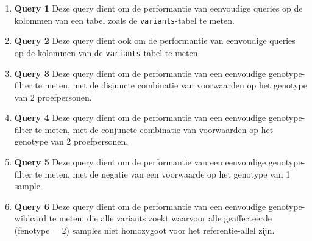 \begin{enumerate}
\item \textbf{Query 1} Deze query dient om de performantie van eenvoudige queries op de kolommen van een tabel zoals de \texttt{variants}-tabel te meten.

\begin{adjustwidth}{-1.0in}{}

\end{adjustwidth}

\item \textbf{Query 2} Deze query dient ook om de performantie van eenvoudige queries op de kolommen van de \texttt{variants}-tabel te meten.

\begin{adjustwidth}{-1.0in}{}

\end{adjustwidth}

\item \textbf{Query 3} Deze query dient om de performantie van een eenvoudige genotype-filter te meten, met de disjuncte combinatie van voorwaarden op het genotype van 2 proefpersonen.

\begin{adjustwidth}{-1.0in}{}

\end{adjustwidth}

\item \textbf{Query 4} Deze query dient om de performantie van een eenvoudige genotype-filter te meten, met de conjuncte combinatie van voorwaarden op het genotype van 2 proefpersonen.

\begin{adjustwidth}{-1.0in}{}

\end{adjustwidth}

\item \textbf{Query 5} Deze query dient om de performantie van een eenvoudige genotype-filter te meten, met de negatie van een voorwaarde op het genotype van 1 sample.

\begin{adjustwidth}{-1.0in}{}

\end{adjustwidth}

\item \textbf{Query 6} Deze query dient om de performantie van een eenvoudige genotype-wildcard te meten, die alle variants zoekt waarvoor alle geaffecteerde (fenotype = 2) samples niet homozygoot voor het referentie-allel zijn.


\end{enumerate}
